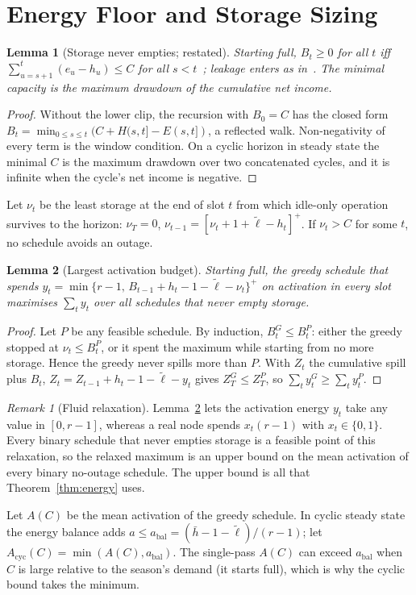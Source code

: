 \documentclass[final,5p,times,twocolumn]{elsarticle}
\newtheorem{lemma}{Lemma}
\theoremstyle{definition}
\theoremstyle{remark}
\newtheorem{remark}{Remark}
\newcommand{\lt}{\tilde{\ell}}
\begin{document}
\section{Energy Floor and Storage Sizing}\label{sec:energy}
\begin{lemma}[Storage never empties; restated]\label{lem:moser}
Starting full, $B_t\ge0$ for all $t$ iff $\sum_{u=s+1}^t(e_u-h_u)\le C$ for all $s<t$~\cite[Thm.~4,5]{moser2007rts}; leakage enters as in~\cite[Eq.~8]{kansal2007}. The minimal capacity is the maximum drawdown of the cumulative net income.
\end{lemma}
\begin{proof}
Without the lower clip, the recursion with $B_0=C$ has the closed form $B_t=\min_{0\le s\le t}(C+H(s,t]-E(s,t])$, a reflected walk. Non-negativity of every term is the window condition. On a cyclic horizon in steady state the minimal $C$ is the maximum drawdown over two concatenated cycles, and it is infinite when the cycle's net income is negative.
\end{proof}

Let $\nu_t$ be the least storage at the end of slot $t$ from which idle-only operation survives to the horizon: $\nu_T=0$, $\nu_{t-1}=[\nu_t+1+\lt-h_t]^+$. If $\nu_t>C$ for some $t$, no schedule avoids an outage.

\begin{lemma}[Largest activation budget]\label{lem:greedy}
Starting full, the greedy schedule that spends $y_t=\min\{r-1,\,B_{t-1}+h_t-1-\lt-\nu_t\}^+$ on activation in every slot maximises $\sum_ty_t$ over all schedules that never empty storage.
\end{lemma}
\begin{proof}
Let $P$ be any feasible schedule. By induction, $B^G_t\le B^P_t$: either the greedy stopped at $\nu_t\le B^P_t$, or it spent the maximum while starting from no more storage. Hence the greedy never spills more than $P$. With $Z_t$ the cumulative spill plus $B_t$, $Z_t=Z_{t-1}+h_t-1-\lt-y_t$ gives $Z^G_T\le Z^P_T$, so $\sum_ty^G_t\ge\sum_ty^P_t$.
\end{proof}
\begin{remark}[Fluid relaxation]
Lemma~\ref{lem:greedy} lets the activation energy $y_t$ take any value in $[0,r-1]$, whereas a real node spends $x_t(r-1)$ with $x_t\in\{0,1\}$. Every binary schedule that never empties storage is a feasible point of this relaxation, so the relaxed maximum is an upper bound on the mean activation of every binary no-outage schedule. The upper bound is all that Theorem~\ref{thm:energy} uses.
\end{remark}
Let $A(C)$ be the mean activation of the greedy schedule. In cyclic steady state the energy balance adds $a\le a_{\mathrm{bal}}=(\bar h-1-\lt)/(r-1)$; let $A_{\mathrm{cyc}}(C)=\min(A(C),a_{\mathrm{bal}})$. The single-pass $A(C)$ can exceed $a_{\mathrm{bal}}$ when $C$ is large relative to the season's demand (it starts full), which is why the cyclic bound takes the minimum.
\end{document}
